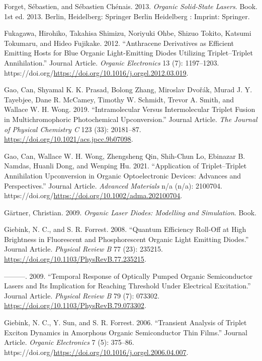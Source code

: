 \documentclass[
  letterpaper,
  DIV=11,
  numbers=noendperiod,
  oneside]{scrreprt}
\newlength{\cslhangindent}
\newlength{\cslentryspacingunit} %
\newenvironment{CSLReferences}[2] %
 {%
  \setlength{\parindent}{0pt}
  \ifodd #1
  \let\oldpar\par
  \def\par{\hangindent=\cslhangindent\oldpar}
  \fi
  \setlength{\parskip}{#2\cslentryspacingunit}
 }%
 {}
\begin{document}
\begin{CSLReferences}{1}{0}
\leavevmode{}%
Forget, Sébastien, and Sébastien Chénais. 2013. \emph{Organic
Solid-State Lasers}. Book. 1st ed. 2013. Berlin, Heidelberg: Springer
Berlin Heidelberg : Imprint: Springer.

\leavevmode{}%
Fukagawa, Hirohiko, Takahisa Shimizu, Noriyuki Ohbe, Shizuo Tokito,
Katsumi Tokumaru, and Hideo Fujikake. 2012. {``Anthracene Derivatives as
Efficient Emitting Hosts for Blue Organic Light-Emitting Diodes
Utilizing Triplet--Triplet Annihilation.''} Journal Article.
\emph{Organic Electronics} 13 (7): 1197--1203.
https://doi.org/\url{https://doi.org/10.1016/j.orgel.2012.03.019}.

\leavevmode{}%
Gao, Can, Shyamal K. K. Prasad, Bolong Zhang, Miroslav Dvořák, Murad J.
Y. Tayebjee, Dane R. McCamey, Timothy W. Schmidt, Trevor A. Smith, and
Wallace W. H. Wong. 2019. {``Intramolecular Versus Intermolecular
Triplet Fusion in Multichromophoric Photochemical Upconversion.''}
Journal Article. \emph{The Journal of Physical Chemistry C} 123 (33):
20181--87. \url{https://doi.org/10.1021/acs.jpcc.9b07098}.

\leavevmode{}%
Gao, Can, Wallace W. H. Wong, Zhengsheng Qin, Shih-Chun Lo, Ebinazar B.
Namdas, Huanli Dong, and Wenping Hu. 2021. {``Application of
Triplet--Triplet Annihilation Upconversion in Organic Optoelectronic
Devices: Advances and Perspectives.''} Journal Article. \emph{Advanced
Materials} n/a (n/a): 2100704.
https://doi.org/\url{https://doi.org/10.1002/adma.202100704}.

\leavevmode{}%
Gärtner, Christian. 2009. \emph{Organic Laser Diodes: Modelling and
Simulation}. Book.

\leavevmode{}%
Giebink, N. C., and S. R. Forrest. 2008. {``Quantum Efficiency Roll-Off
at High Brightness in Fluorescent and Phosphorescent Organic Light
Emitting Diodes.''} Journal Article. \emph{Physical Review B} 77 (23):
235215. \url{https://doi.org/10.1103/PhysRevB.77.235215}.

\leavevmode{}%
---------. 2009. {``Temporal Response of Optically Pumped Organic
Semiconductor Lasers and Its Implication for Reaching Threshold Under
Electrical Excitation.''} Journal Article. \emph{Physical Review B} 79
(7): 073302. \url{https://doi.org/10.1103/PhysRevB.79.073302}.

\leavevmode{}%
Giebink, N. C., Y. Sun, and S. R. Forrest. 2006. {``Transient Analysis
of Triplet Exciton Dynamics in Amorphous Organic Semiconductor Thin
Films.''} Journal Article. \emph{Organic Electronics} 7 (5): 375--86.
https://doi.org/\url{https://doi.org/10.1016/j.orgel.2006.04.007}.


\end{CSLReferences}
\end{document}
